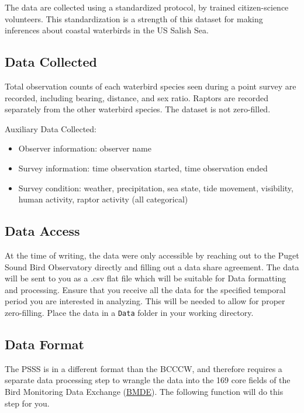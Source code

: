 \documentclass[
  letterpaper,
  DIV=11,
  numbers=noendperiod]{scrreprt}
\begin{document}
The data are collected using a standardized protocol, by trained
citizen-science volunteers. This standardization is a strength of this
dataset for making inferences about coastal waterbirds in the US Salish
Sea.

\subsection{Data Collected}\label{data-collected-1}

Total observation counts of each waterbird species seen during a point
survey are recorded, including bearing, distance, and sex ratio. Raptors
are recorded separately from the other waterbird species. The dataset is
not zero-filled.

Auxiliary Data Collected:

\begin{itemize}
\item
  Observer information: observer name
\item
  Survey information: time observation started, time observation ended
\item
  Survey condition: weather, precipitation, sea state, tide movement,
  visibility, human activity, raptor activity (all categorical)
\end{itemize}

\subsection{Data Access}\label{data-access-1}

At the time of writing, the data were only accessible by reaching out to
the Puget Sound Bird Observatory directly and filling out a data share
agreement. The data will be sent to you as a .csv flat file which will
be suitable for Data formatting and processing. Ensure that you receive
all the data for the specified temporal period you are interested in
analyzing. This will be needed to allow for proper zero-filling. Place
the data in a \texttt{Data} folder in your working directory.

\subsection{Data Format}\label{data-format}

The PSSS is in a different format than the BCCCW, and therefore requires
a separate data processing step to wrangle the data into the 169 core
fields of the Bird Monitoring Data Exchange
(\href{https://naturecounts.ca/nc/default/nc_bmde.jsp}{BMDE}). The
following function will do this step for you.
\end{document}
